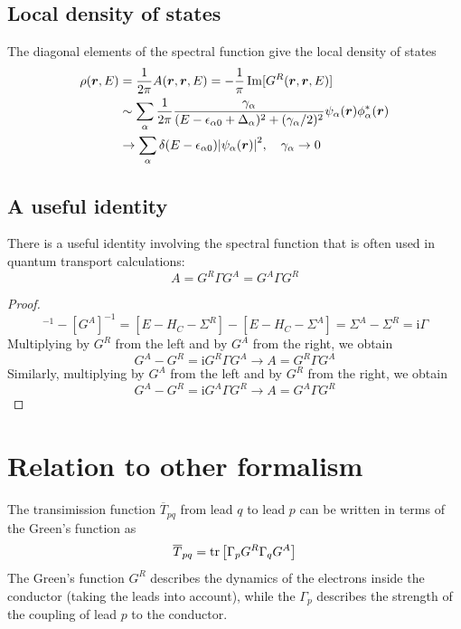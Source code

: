\documentclass[11pt,a4paper]{book}
\theoremstyle{plain}
\theoremstyle{definition}
\theoremstyle{remark}
\newcommand{\ii}{\mathrm{i}}                      %
\renewcommand{\vec}[1]{\boldsymbol{#1}}
\begin{document}
\subsection{Local density of states}
The diagonal elements of the spectral function give the local density of states
\begin{equation}
    \begin{aligned}
    \rho(\vec{r},E) & = \frac{1}{2 \pi} A(\vec{r},\vec{r}, E) = -\frac{1}{\pi}\Im[G^R(\vec{r},\vec{r},E)] \\
    & \sim \sum_\alpha \frac{1}{2 \pi} \frac{\gamma_\alpha}{(E - \epsilon_{\alpha 0} + \Delta_\alpha)^2 + (\gamma_\alpha/2)^2} \psi_\alpha(\vec{r}) \phi_\alpha^*(\vec{r}) \\
    & \to \sum_\alpha \delta(E - \epsilon_{\alpha 0}) \abs{\psi_\alpha(\vec{r})}^2, \quad \gamma_\alpha \to 0
    \end{aligned}
\end{equation}
\subsection{A useful identity}
There is a useful identity involving the spectral function that is often used in quantum transport calculations:
\begin{equation}
    A = G^R \Gamma G^A = G^A \Gamma G^R
\end{equation}
\begin{proof}
    \begin{equation}
        [G^R]^{-1} - [G^A]^{-1} = \left[E - H_C - \Sigma^R \right] - \left[E - H_C - \Sigma^A \right] = \Sigma^A - \Sigma^R = \ii \Gamma
    \end{equation}
    Multiplying by $G^R$ from the left and by $G^A$ from the right, we obtain
    \begin{equation}
        G^A - G^R = \ii G^R \Gamma G^A \to A = G^R \Gamma G^A
    \end{equation}
    Similarly, multiplying by $G^A$ from the left and by $G^R$ from the right, we obtain
    \begin{equation}
        G^A - G^R = \ii G^A \Gamma G^R  \to A = G^A \Gamma G^R
    \end{equation}
\end{proof}
\section{Relation to other formalism}
The transimission function $\overline{T}_{pq}$ from lead $q$ to lead $p$ can be written in terms of the Green's function as
\begin{equation}
    \overline{T}_{pq} = \trace \left[ \Gamma_p G^R \Gamma_q G^A \right]
\end{equation}
The Green's function $G^R$ describes the dynamics of the electrons inside the conductor (taking the leads into account), while the $\Gamma_p$ describes the strength of the coupling of lead $p$ to the conductor.
\end{document}
